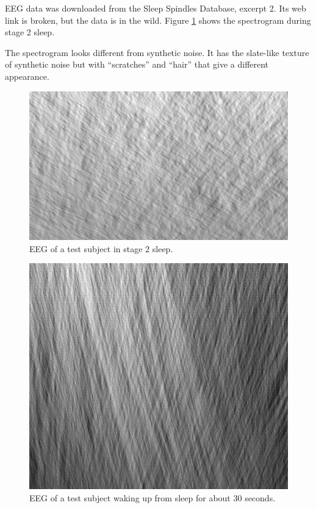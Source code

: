 EEG data was downloaded from the Sleep Spindles Database, excerpt 2.
Its web link is broken, but the data is in the wild.
Figure \ref{fig:excerpt2} shows the spectrogram during stage 2 sleep.

The spectrogram looks different from synthetic noise. 
It has the slate-like texture of synthetic noise but with ``scratches'' and ``hair''
that give a different appearance.

\begin{figure}
  \includegraphics[width=\linewidth]{../source/excerpt2.jpg}
  \caption{EEG of a test subject in stage 2 sleep.}
  \label{fig:excerpt2}
\end{figure}

\begin{figure}
  \includegraphics[width=\linewidth]{../source/wokessd.jpg}
  \caption{EEG of a test subject waking up from sleep for about 30 seconds.}
  \label{fig:wokessd}
\end{figure}

